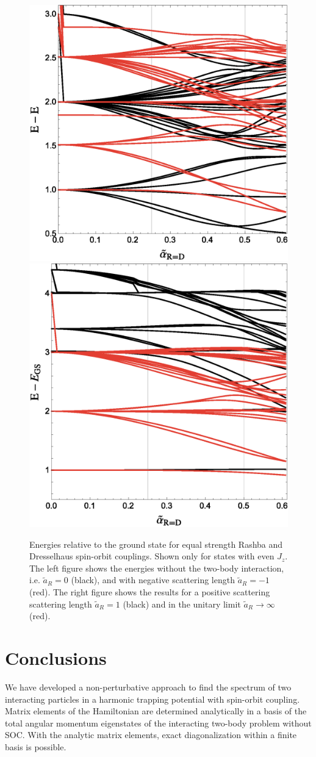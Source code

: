 \documentclass[%
 preprint,
 amsmath,amssymb,
 aps,
]{revtex4-1}
\begin{document}
\begin{figure}
\includegraphics[width=0.5\linewidth]{Figures/R=DExcitation_a0am1}\nobreak
\includegraphics[width=0.5\linewidth]{Figures/R=DExcitation_ap1aInf}
\caption{\label{fig:R=DExcitationSpectrum} Energies relative to the ground state for equal strength Rashba and Dresselhaus spin-orbit couplings. Shown only for states with even $J_z$. The left figure shows the energies without the two-body interaction, i.e. $\tilde{a}_R=0$ (black), and with negative scattering length $\tilde{a}_R=-1$ (red). The right figure shows the results for a positive scattering scattering length $\tilde{a}_R=1$ (black) and in the unitary limit $\tilde{a}_R\rightarrow\infty$ (red).} 
\end{figure}


\section{Conclusions}

We have developed a non-perturbative approach to find the spectrum of two interacting particles in a harmonic trapping potential with spin-orbit coupling. Matrix elements of the Hamiltonian are determined analytically in a basis of the total angular momentum eigenstates of the interacting two-body problem without SOC. With the analytic matrix elements, exact diagonalization within a finite basis is possible.
\end{document}
